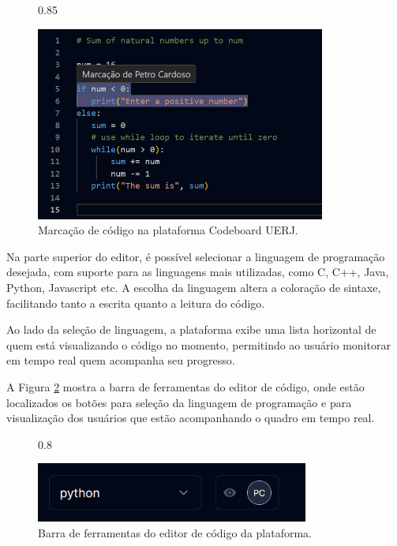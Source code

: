 \begin{figure}[H]{0.85\textwidth}
    \centering
    \caption{Marcação de código na plataforma Codeboard UERJ.}
    \label{fig:code-editor-user-highlight}
    \includegraphics[width=0.85\textwidth]{assets/codeboard/code-editor-user-highlight.png}
\end{figure}

Na parte superior do editor, é possível selecionar a linguagem de programação desejada, com suporte para as linguagens mais utilizadas, como C, C++, Java, Python, Javascript etc. A escolha da linguagem altera a coloração de sintaxe, facilitando tanto a escrita quanto a leitura do código. 

Ao lado da seleção de linguagem, a plataforma exibe uma lista horizontal de quem está visualizando o código no momento, permitindo ao usuário monitorar em tempo real quem acompanha seu progresso.

A Figura \ref{fig:code-editor-toolbar} mostra a barra de ferramentas do editor de código, onde estão localizados os botões para seleção da linguagem de programação e para visualização dos usuários que estão acompanhando o quadro em tempo real.

\begin{figure}[H]{0.8\textwidth}
    \centering
    \caption{Barra de ferramentas do editor de código da plataforma.}
    \label{fig:code-editor-toolbar}
    \includegraphics[width=0.8\textwidth]{assets/codeboard/code-editor-toolbar.png}
\end{figure}


